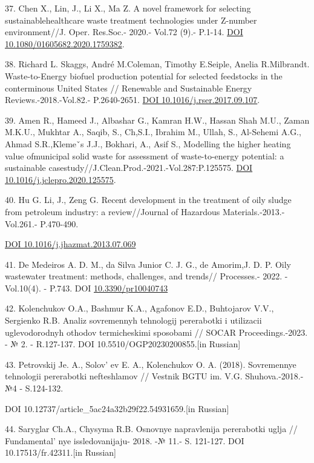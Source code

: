 37. Chen X., Lin, J., Li X., Ma Z. A novel framework for selecting
sustainablehealthcare waste treatment technologies under Z-number
environment//J. Oper. Res.Soc.- 2020.- Vol.72 (9).- P.1-14.
\href{https://doi.org/10.1080/01605682.2020.1759382}{DOI
10.1080/01605682.2020.1759382}.

38. Richard L. Skaggs, André M.Coleman, Timothy E.Seiple, Anelia
R.Milbrandt. Waste-to-Energy biofuel production potential for selected
feedstocks in the conterminous United States // Renewable and
Sustainable Energy Reviews.-2018.-Vol.82.- P.2640-2651.
\href{https://doi.org/10.1016/j.rser.2017.09.107}{DOI
10.1016/j.rser.2017.09.107}.

39. Amen R., Hameed J., Albashar G., Kamran H.W., Hassan Shah M.U.,
Zaman M.K.U., Mukhtar A., Saqib, S., Ch,S.I., Ibrahim M., Ullah, S.,
Al-Sehemi A.G., Ahmad S.R.,Klemeˇs J.J., Bokhari, A., Asif S., Modelling
the higher heating value ofmunicipal solid waste for assessment of
waste-to-energy potential: a sustainable
casestudy//J.Clean.Prod.-2021.-Vol.287:P.125575.
\href{https://doi.org/10.1016/j.jclepro.2020.125575}{DOI
10.1016/j.jclepro.2020.125575}.

40. Hu G. Li, J., Zeng G. Recent development in the treatment of oily
sludge from petroleum industry: a review//Journal of Hazardous
Materials.-2013.- Vol.261.- P.470-490.

\href{https://doi.org/10.1016/j.jhazmat.2013.07.069}{DOI
10.1016/j.jhazmat.2013.07.069}

41. De Medeiros A. D. M., da Silva Junior C. J. G., de Amorim,J. D. P.
Oily wastewater treatment: methods, challenges, and trends// Processes.-
2022. - Vol.10(4). - P.743. DOI
\href{http://dx.doi.org/10.3390/pr10040743}{10.3390/pr10040743}

42. Kolenchukov O.A., Bashmur K.A., Agafonov E.D., Buhtojarov V.V.,
Sergienko R.B. Analiz sovremennyh tehnologij pererabotki i utilizacii
uglevodorodnyh othodov termicheskimi sposobami // SOCAR
Proceedings.-2023. - № 2. - R.127-137. DOI 10.5510/OGP20230200855.{[}in
Russian{]}

43. Petrovskij Je. A., Solov' ev E. A., Kolenchukov O. A.
(2018). Sovremennye tehnologii pererabotki nefteshlamov // Vestnik BGTU
im. V.G. Shuhova.-2018.- №4 - S.124-132.

DOI 10.12737/article\_5ac24a32b29f22.54931659.{[}in Russian{]}

44. Saryglar Ch.A., Chysyma R.B. Osnovnye napravlenija pererabotki uglja
// Fundamental' nye issledovanijaju- 2018. -№ 11.- S.
121-127. DOI 10.17513/fr.42311.{[}in Russian{]}

